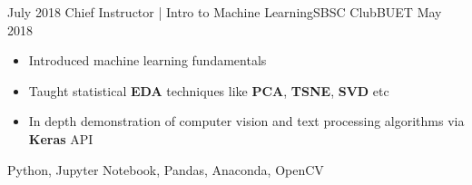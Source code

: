 %
%
%


\begin{experiences}
  \experience
    {July 2018}   {Chief Instructor | Intro to Machine Learning}{SBSC Club}{BUET}
    {May 2018} {
                      \begin{itemize}
                        \item Introduced machine learning fundamentals                         
                        \item Taught statistical \textbf{EDA} techniques like \textbf{PCA}, \textbf{TSNE}, \textbf{SVD} etc         
                        \item In depth demonstration of computer vision and text processing algorithms via \textbf{Keras} API  \\                                                                   
                      \end{itemize}
                    }
                    {Python, Jupyter Notebook, Pandas, Anaconda, OpenCV}
  \emptySeparator
\end{experiences}